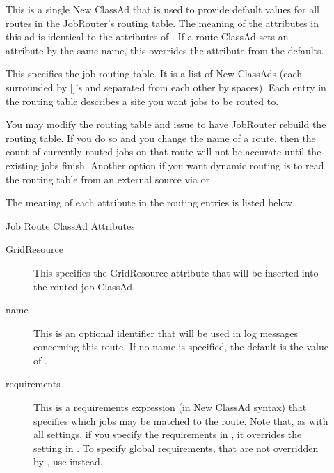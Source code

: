 \begin{description}

\item[] \label{param:JobRouterDefaults}
This is a single New ClassAd that is used to provide default values
for all routes in the JobRouter's routing table.  The meaning of the
attributes in this ad is identical to the attributes of
.  If a route ClassAd sets an
attribute by the same name, this overrides the attribute from the
defaults.

\item[] \label{param:JobRouterEntries}
This specifies the job routing table.  It is a list of New ClassAds
(each surrounded by []'s and separated from each other by spaces).
Each entry in the routing table describes a site you want jobs to be
routed to.

You may modify the routing table and issue  to have
JobRouter rebuild the routing table.  If you do so and you change the
name of a route, then the count of currently routed jobs on that route
will not be accurate until the existing jobs finish.  Another option
if you want dynamic routing is to read the routing table from an
external source via  or
.

The meaning of each attribute in the routing entries is listed below.


{\Large Job Route ClassAd Attributes}

\begin{description}

\item[GridResource] This specifies the GridResource attribute that
will be inserted into the routed job ClassAd.

\item[name] This is an optional identifier that will be used in log
messages concerning this route.  If no name is specified, the default
is the value of .

\item[requirements] This is a requirements expression (in New ClassAd
syntax) that specifies which jobs may be matched to the route.  Note
that, as with all settings, if you specify the requirements in
, it overrides the setting in
.  To specify global requirements, that
are not overridden by , use
 instead.


\end{description}
\end{description}
